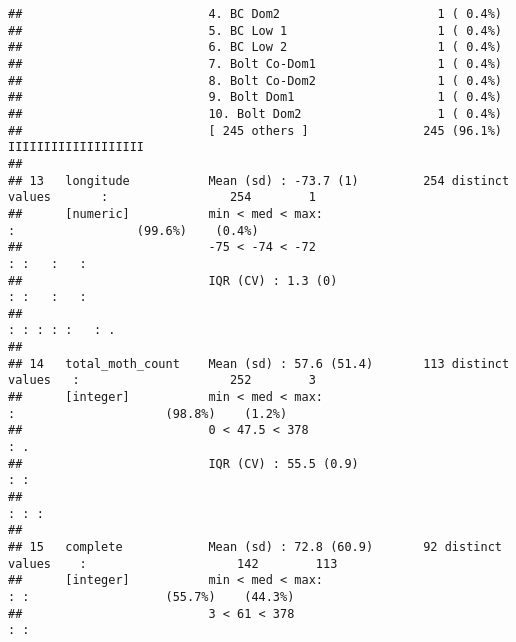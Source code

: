 \documentclass[
]{article}
\begin{document}
\begin{verbatim}
##                          4. BC Dom2                      1 ( 0.4%)                                                      
##                          5. BC Low 1                     1 ( 0.4%)                                                      
##                          6. BC Low 2                     1 ( 0.4%)                                                      
##                          7. Bolt Co-Dom1                 1 ( 0.4%)                                                      
##                          8. Bolt Co-Dom2                 1 ( 0.4%)                                                      
##                          9. Bolt Dom1                    1 ( 0.4%)                                                      
##                          10. Bolt Dom2                   1 ( 0.4%)                                                      
##                          [ 245 others ]                245 (96.1%)           IIIIIIIIIIIIIIIIIII                        
## 
## 13   longitude           Mean (sd) : -73.7 (1)         254 distinct values       :                 254        1         
##      [numeric]           min < med < max:                                        :                 (99.6%)    (0.4%)    
##                          -75 < -74 < -72                                       : :   :   :                              
##                          IQR (CV) : 1.3 (0)                                    : :   :   :                              
##                                                                              : : : : :   : .                            
## 
## 14   total_moth_count    Mean (sd) : 57.6 (51.4)       113 distinct values   :                     252        3         
##      [integer]           min < med < max:                                    :                     (98.8%)    (1.2%)    
##                          0 < 47.5 < 378                                      : .                                        
##                          IQR (CV) : 55.5 (0.9)                               : :                                        
##                                                                              : : :                                      
## 
## 15   complete            Mean (sd) : 72.8 (60.9)       92 distinct values    :                     142        113       
##      [integer]           min < med < max:                                    : :                   (55.7%)    (44.3%)   
##                          3 < 61 < 378                                        : :                                        

\end{verbatim}
\end{document}
